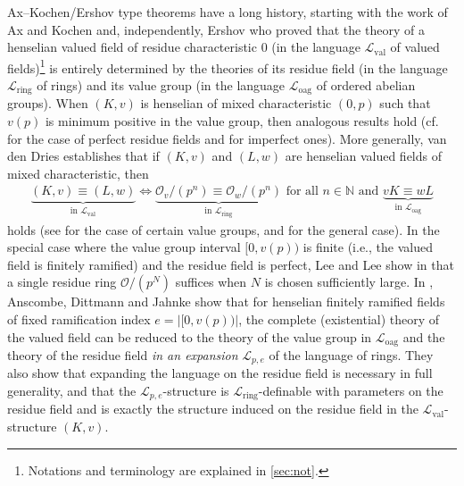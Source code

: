 \documentclass[a4paper]{amsart}
\theoremstyle{mystyle2}
\theoremstyle{mystyle}
\renewcommand{\L}{\mathcal{L}}
\newcommand{\Lring}{\L_{\mathrm{ring}}}
\numberwithin{equation}{section}
\begin{document}
    Ax--Kochen/Ershov type theorems have a long history, starting with the work of
    Ax and Kochen \cite{AK65I} and,
    independently, Ershov \cite{ershovElementaryTheoryMaximal1965} who proved that the theory of a henselian
    valued field of residue characteristic $0$ (in the language
    $\mathcal{L}_\mathrm{val}$ of valued fields)\footnote{Notations and terminology are
    explained in \cref{sec:not}.} is entirely determined by the theories of its
    residue field (in the language $\mathcal{L}_\mathrm{ring}$ of rings) and its value group (in the language $\mathcal{L}_\mathrm{oag}$ of ordered abelian
    groups). When $(K,v)$ is henselian of mixed characteristic $(0,p)$ such that $v(p)$
    is minimum positive in the value group, then analogous results hold (cf.~\cite{AK65II}
    for the case of perfect residue fields and \cite{anscombe-jahnke2022cohen} for imperfect ones). More generally, van den Dries establishes that if $(K,v)$ and $(L,w)$ are 
    henselian valued fields
    of mixed characteristic, then
    \begin{align}
        \underbrace{(K,v) \equiv (L,w)}_{\text{in }\mathcal{L}_\mathrm{val}} \Longleftrightarrow \underbrace{\mathcal{O}_v/(p^n) \equiv \mathcal{O}_w/(p^n)}_{\text{in }\mathcal{L}_{\mathrm{ring}}}
        \textrm{ for all }n \in \mathbb{N} \textrm{ and } \underbrace{vK \equiv wL}_{\text{in }\mathcal{L}_{\mathrm{oag}}} \tag{$\star$}\label{eq:AKE}
    \end{align}
    holds (see \cite{Weis} for the case of certain value groups, and \cite[p. 144]{vdd} for the general case).
    In the special case where the value group interval $[0,v(p))$ is finite (i.e., the valued field
    is finitely ramified) and the residue
    field is perfect, 
    Lee and Lee show in \cite{LeeLee} that a single residue ring $\mathcal{O}/(p^N)$ suffices when \(N\) is chosen sufficiently large.
    In \cite{anscombeAxKochenErshov2024}, Anscombe, Dittmann and Jahnke show that 
    for henselian finitely ramified fields of fixed ramification index $e=|[0,v(p))|$, the
    complete (existential) theory of the valued field can be reduced to 
    the theory of the value group in $\mathcal{L}_\mathrm{oag}$ and the theory
    of the residue field \emph{in an expansion} $\mathcal{L}_{p,e}$ of the language of rings.
    They also show that expanding the language on the residue field is necessary in full generality, and that the $\mathcal{L}_{p,e}$-structure is $\Lring$-definable with parameters
    on the residue field and is exactly the structure induced on the residue field in the
    $\mathcal{L}_\mathrm{val}$-structure $(K,v)$.
\end{document}
